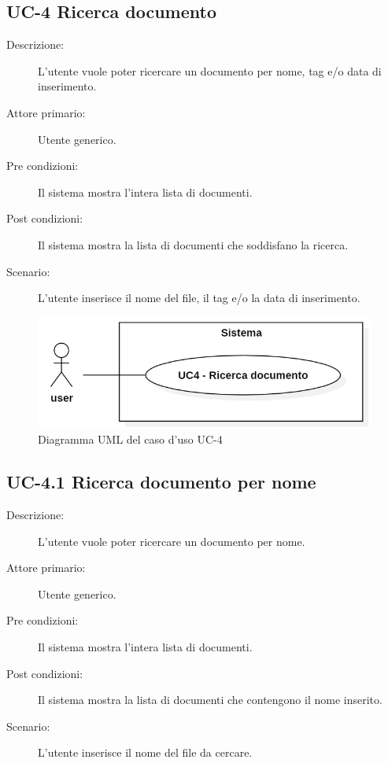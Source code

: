 \subsection{UC-4 Ricerca documento}
\begin{description}
    \item[Descrizione:] L’utente vuole poter ricercare un documento per nome, tag e/o data di inserimento.
    \item[Attore primario:] Utente generico.
    \item[Pre condizioni:] Il sistema mostra l’intera lista di documenti.
    \item[Post condizioni:] Il sistema mostra la lista di documenti che soddisfano la ricerca.
    \item[Scenario:] L’utente inserisce il nome del file, il tag e/o la data di inserimento.
\end{description}

\begin{figure}[H]
    \centering
    \includegraphics[width=0.8\linewidth]{UC4.PNG}
    \caption{Diagramma UML del caso d'uso UC-4}
    \label{fig:UC4}
\end{figure}

\subsection{UC-4.1 Ricerca documento per nome}
\begin{description}
    \item[Descrizione:] L’utente vuole poter ricercare un documento per nome.
    \item[Attore primario:] Utente generico.
    \item[Pre condizioni:] Il sistema mostra l’intera lista di documenti.
    \item[Post condizioni:] Il sistema mostra la lista di documenti che contengono il nome inserito.
    \item[Scenario:] L’utente inserisce il nome del file da cercare.
\end{description}

